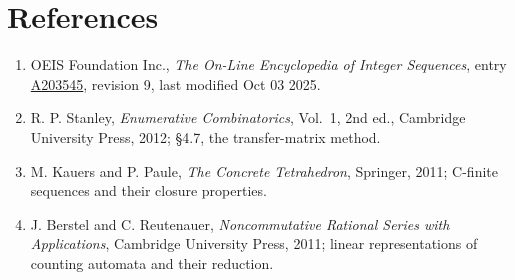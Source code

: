 \documentclass[11pt]{article}
\theoremstyle{definition}
\begin{document}
\section{References}

\begin{enumerate}

\item OEIS Foundation Inc., \emph{The On-Line Encyclopedia of Integer Sequences}, entry \href{https://oeis.org/A203545}{A203545}, revision 9, last modified Oct 03 2025.

\item R. P. Stanley, \emph{Enumerative Combinatorics}, Vol.~1, 2nd ed., Cambridge University Press, 2012; \S4.7, the transfer-matrix method.

\item M. Kauers and P. Paule, \emph{The Concrete Tetrahedron}, Springer, 2011; C-finite sequences and their closure properties.

\item J. Berstel and C. Reutenauer, \emph{Noncommutative Rational Series with Applications}, Cambridge University Press, 2011; linear representations of counting automata and their reduction.

\end{enumerate}
\end{document}
